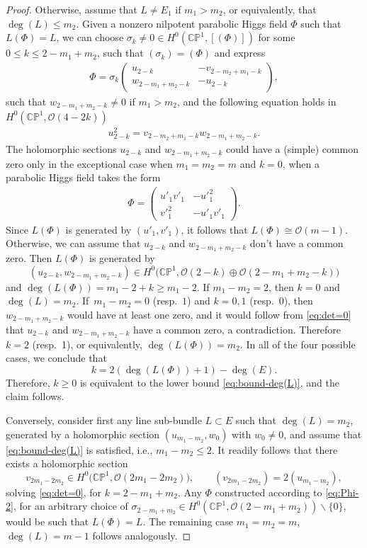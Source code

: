 \documentclass[10pt,a4paper]{amsart}
\newcommand{\field}[1]{\ensuremath{\mathbb{#1}}}
\newcommand{\CC}{\field{C}}
\newcommand{\PP}{\field{P}}
\newcommand{\calO}{\mathcal{O}}
\numberwithin{equation}{section}
\begin{document}
\begin{proof}
Otherwise, assume that $L\neq E_{1}$ if $m_{1}>m_{2}$, or equivalently, that $\deg(L)\leq m_{2}$. Given a nonzero nilpotent parabolic Higgs field $\Phi$ such that $L(\Phi)=L$, we can choose $\sigma_{k}\neq 0\in H^{0}(\CC\PP^{1},[(\Phi)])$ for some $0\leq k\leq 2-m_{1}+m_{2}$, such that $(\sigma_{k})=(\Phi)$ and express
\begin{gather}\label{eq:Phi-2}
\Phi =
\sigma_{k}\begin{pmatrix}
u_{2-k} & -v_{2-m_{2}+m_{1}-k}\\
w_{2-m_{1}+m_{2}-k} & -u_{2-k}
\end{pmatrix}\!,
\end{gather}
such that $w_{2-m_{1}+m_{2}-k}\neq 0$ if $m_{1} > m_{2}$, and the following equation holds in $H^{0}(\CC\PP^{1},\calO(4-2k))$
\begin{gather}\label{eq:det=0}
u_{2-k}^{2}=v_{2-m_{2}+m_{1}-k}w_{2-m_{1}+m_{2}-k}.
\end{gather}
The holomorphic sections $u_{2-k}$ and $w_{2-m_{1}+m_{2}-k}$ could have a (simple) common zero only in the exceptional case when $m_{1}=m_{2}=m$ and $k=0$, when a parabolic Higgs field takes the form
\begin{gather}\label{eq:Phi(m-1)}
\Phi = \begin{pmatrix}
u'_{1}v'_{1} & -u'^{2}_{1}\\
v'^{2}_{1} & -u'_{1}v'_{1}
\end{pmatrix}\!.
\end{gather}
Since
$L(\Phi)$ is generated by $(u'_{1},v'_{1})$, it follows that $L(\Phi)\cong \calO(m-1)$.
Otherwise, we can assume that $u_{2-k}$ and $w_{2-m_{1}+m_{2}-k}$ don't have a common zero. Then $L(\Phi)$ is generated by
\[
(u_{2-k},w_{2-m_{1}+m_{2}-k})\in H^{0}\bigl(\CC\PP^{1},\calO(2-k)\oplus\calO(2-m_{1}+m_{2}-k)\bigr)
\]
and $\deg(L(\Phi)) = m_{1}-2 + k\geq m_{1}-2$. If $m_{1}-m_{2}=2$, then $k=0$ and $\deg(L)=m_{2}$. If~$m_{1}-m_{2}=0$ (resp.~$1$) and $k=0,1$ (resp.~$0$), then $w_{2-m_{1}+m_{2}-k}$ would have at least one zero, and it would follow from \eqref{eq:det=0} that $u_{2-k}$ and $w_{2-m_{1}+m_{2}-k}$ have a common zero, a contradiction. Therefore $k=2$ (resp.~1), or equivalently, $\deg(L(\Phi)) = m_{2}$. In all of the four possible cases, we conclude that
\[
k= 2(\deg(L(\Phi))+1) -\deg(E).
\]
Therefore, $k \geq 0$ is equivalent to the lower bound \eqref{eq:bound-deg(L)}, and the claim follows.

Conversely, consider first any line sub-bundle $L\subset E$ such that $\deg(L)=m_{2}$, generated by a holomorphic section $(u_{m_{1}-m_{2}},w_{0})$ with $w_{0}\neq 0$, and assume that \eqref{eq:bound-deg(L)} is satisfied, i.e., $m_{1}-m_{2}\leq 2$. It readily follows that there exists a holomorphic section
\[
v_{2m_{1}-2m_{2}} \in H^{0}\bigl(\CC\PP^{1},\calO(2m_{1}-2m_{2})\bigr),\qquad
(v_{2m_{1}-2m_{2}}) = 2(u_{m_{1}-m_{2}}),
\]
solving \eqref{eq:det=0}, for $k =2-m_{1}+m_{2}$. Any $\Phi$ constructed according to \eqref{eq:Phi-2}, for an arbitrary choice of $\sigma_{2-m_{1}+m_{2}}\in H^{0}(\CC\PP^{1},\calO(2-m_{1}+m_{2}))\backslash\{0\}$, would be such that $L(\Phi)=L$. The remaining case $m_{1}=m_{2}=m$, $\deg(L)=m-1$ follows analogously.
\end{proof}
\end{document}
